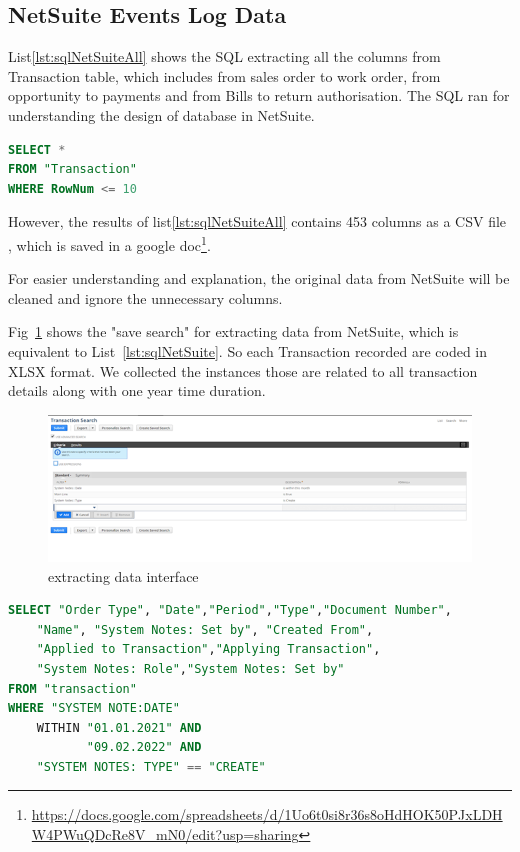 \subsection{NetSuite Events Log Data}
List\ref{lst:sqlNetSuiteAll} shows the SQL extracting all the columns from Transaction table, which includes from sales order to work order, from opportunity to payments and from Bills to return authorisation. The SQL ran for understanding the design of database in NetSuite.

\begin{lstlisting}[language=SQL, caption={comprehensive data SQL}, label={lst:sqlNetSuiteAll} ]
SELECT *
FROM "Transaction"
WHERE RowNum <= 10
\end{lstlisting}

However,  the results of list\ref{lst:sqlNetSuiteAll} contains 453 columns as a CSV file , which is saved in a google doc\footnote{
\url{https://docs.google.com/spreadsheets/d/1Uo6t0si8r36s8oHdHOK50PJxLDHW4PWuQDcRe8V_mN0/edit?usp=sharing}}.

For  easier understanding and explanation, the original data from NetSuite will be cleaned and ignore the unnecessary columns. 

Fig~\ref{figure:saveSearch} shows the "save search" for extracting data from NetSuite, which is equivalent to List~\ref{lst:sqlNetSuite}.  So each Transaction recorded are coded in XLSX format. We collected the instances those are related to all transaction details along with one year time duration. 


\begin{figure}[!htb]
    \centering 
    \includegraphics[scale=0.7]{resource/data.png}
    \caption{extracting data interface}
    \label{figure:saveSearch}
\end{figure}



\begin{lstlisting}[language=SQL, caption={equal to SQL}, label={lst:sqlNetSuite} ]
SELECT "Order Type", "Date","Period","Type","Document Number",
    "Name", "System Notes: Set by", "Created From", 
    "Applied to Transaction","Applying Transaction", 
    "System Notes: Role","System Notes: Set by"  
FROM "transaction"
WHERE "SYSTEM NOTE:DATE" 
    WITHIN "01.01.2021" AND 
           "09.02.2022" AND 
    "SYSTEM NOTES: TYPE" == "CREATE"
\end{lstlisting}

